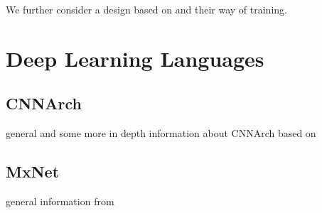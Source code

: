 We further consider a design based on \cite{chen2015deepdriving} and their way of training.


\section{Deep Learning Languages}\label{sec: DLL}

\subsection{CNNArch}\label{subsec: CNNArch}

general and some more in depth information about CNNArch based on \cite{CNNArch}

\subsection{MxNet}\label{subsec: MxNet}

general information from \cite{chen2015mxnet}

